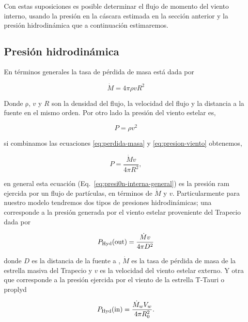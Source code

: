 Con estas suposiciones es posible determinar el flujo de momento del viento interno, usando la presión en la cáscara estimada en la sección anterior y la presión hidrodinámica que a continuación estimaremos.  

\subsection{Presión hidrodinámica}
\label{sec:pressure}

 En términos generales la tasa de pérdida de masa está dada por

\begin{equation}
  \label{eq:perdida-masa}
  \dot{M}=4\pi \rho v R^{2}
\end{equation}

Donde \(\mathrm{\rho}\), \(v\) y \(R\) son la densidad del flujo, la velocidad del flujo y la distancia a la fuente en el mismo orden. Por otro lado la presión del viento estelar es,

\begin{equation}
  \label{eq:presion-viento}
  P=\rho v^{2}
\end{equation}

si combinamos las ecuaciones \ref{eq:perdida-masa} y \ref{eq:presion-viento} obtenemos,

\begin{equation}
  \label{eq:presi0n-interna-general}
  P=\frac{\dot{M} v}{4 \pi R^{2}}, 
\end{equation}
 
en general esta ecuación (Eq.~\ref{eq:presi0n-interna-general}) es la presión ram ejercida por un flujo de partículas, en términos de \(\dot{M}\) y \(v\). Particularmente para nuestro modelo tendremos  dos tipos de presiones hidrodinámicas; una corresponde a la presión generada por el viento estelar proveniente del Trapecio dada por

\begin{equation}
  \label{eq:presion-externa}
   P_{\text{Hyd}}(\mathrm{out}{})=\frac{\dot{M}v}{4 \pi D^{2}}
\end{equation}

donde \(D\) es la distancia de la fuente a \thC{}, \(\dot{M}\) es la tasa de pérdida de masa de la estrella masiva del Trapecio y \(v\) es la velocidad del viento estelar externo. Y otra que corresponde a la presión ejercida por el viento de la estrella T-Tauri o proplyd

 
\begin{equation}
  \label{eq:presion-interna}
  P_{\text{Hyd}}(\mathrm{in}{})=\frac{\dot{M}_{w} V_{w}}{4 \pi R_{0}^{2}}.
\end{equation}

